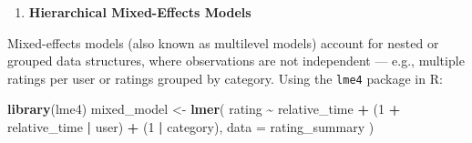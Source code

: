 \documentclass[
]{article}
\newenvironment{Shaded}{\begin{snugshade}}{\end{snugshade}}
\newcommand{\AttributeTok}[1]{\textcolor[rgb]{0.13,0.29,0.53}{#1}}
\newcommand{\DecValTok}[1]{\textcolor[rgb]{0.00,0.00,0.81}{#1}}
\newcommand{\FunctionTok}[1]{\textcolor[rgb]{0.13,0.29,0.53}{\textbf{#1}}}
\newcommand{\NormalTok}[1]{#1}
\newcommand{\OtherTok}[1]{\textcolor[rgb]{0.56,0.35,0.01}{#1}}
\newcommand{\SpecialCharTok}[1]{\textcolor[rgb]{0.81,0.36,0.00}{\textbf{#1}}}
\providecommand{\tightlist}{%
  \setlength{\itemsep}{0pt}\setlength{\parskip}{0pt}}
\begin{document}
\begin{enumerate}
\def\labelenumi{\arabic{enumi}.}
\tightlist
\item
  \textbf{Hierarchical Mixed-Effects Models}
\end{enumerate}

Mixed-effects models (also known as multilevel models) account for
nested or grouped data structures, where observations are not
independent --- e.g., multiple ratings per user or ratings grouped by
category. Using the \texttt{lme4} package in R:

\begin{Shaded}
\begin{Highlighting}[]
\FunctionTok{library}\NormalTok{(lme4)}
\NormalTok{mixed\_model }\OtherTok{\textless{}{-}} \FunctionTok{lmer}\NormalTok{(}
\NormalTok{  rating }\SpecialCharTok{\textasciitilde{}}\NormalTok{ relative\_time }\SpecialCharTok{+}\NormalTok{ (}\DecValTok{1} \SpecialCharTok{+}\NormalTok{ relative\_time }\SpecialCharTok{|}\NormalTok{ user) }\SpecialCharTok{+}\NormalTok{ (}\DecValTok{1} \SpecialCharTok{|}\NormalTok{ category),}
  \AttributeTok{data =}\NormalTok{ rating\_summary}
\NormalTok{)}
\end{Highlighting}
\end{Shaded}
\end{document}

